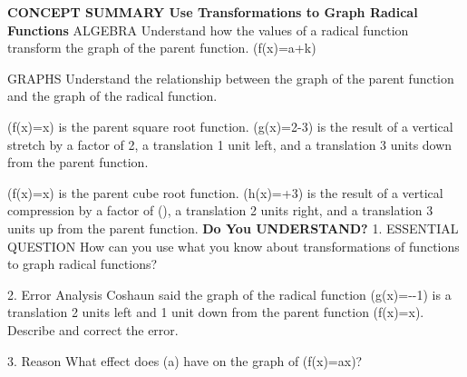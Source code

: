\documentclass{article}
\newenvironment{concept-summary}{}{}    %
\newcommand{\answer}[1]{}               %
\newcommand{\placeholder}[2]{}          %
\newcommand{\te}[1]{}                   %
\begin{document}
\begin{concept-summary}
\textbf{CONCEPT SUMMARY Use Transformations to Graph Radical Functions}
ALGEBRA Understand how the values of a radical function transform the graph of the parent function.
(f(x)=a+k)
\te{Callouts: (a) determines a vertical stretch or compression. (h) determines a horizontal translation. (k) determines a vertical translation.}
GRAPHS Understand the relationship between the graph of the parent function and the graph of the radical function.
\placeholder{graph}{Blue f(x)=sqrt(x) from(0,0), dashed green 2sqrt(x) from(0,0), red g(x)=2sqrt(x+1)-3 from(-1,-3). Curves have rightward arrows. Axes x,y arrows both ends, unit grid x=-2 to 8,y=-5 to 5; x labels 2,4,6, y labels-4,-2,2,4; origin O. No point dots.}
(f(x)=\sqrt x) is the parent square root function.
(g(x)=2-3) is the result of a vertical stretch by a factor of 2, a translation 1 unit left, and a translation 3 units down from the parent function.
\placeholder{graph}{Blue f(x)=cube root(x), dashed green one third cube root(x), both through(0,0), and red h(x)=one third cube root(x-2)+3 with center(2,3). Arrowheads both ends on all curves. Axes x,y with arrows both ends; x grid 2 labels-8,-4,4,8, window-10 to 10; y unit grid labels-2,2,4,6, window-3 to 7. Origin O.}
(f(x)=\sqrt[3]x) is the parent cube root function.
(h(x)=+3) is the result of a vertical compression by a factor of (), a translation 2 units right, and a translation 3 units up from the parent function.
\textbf{Do You UNDERSTAND?}
1. ESSENTIAL QUESTION How can you use what you know about transformations of functions to graph radical functions?
\answer{Vertical stretches and horizontal and vertical translations have the same effect on square root and cube root functions as they have on other types of functions, so you can use what you know about transforming those functions to graph radical functions.}
2. Error Analysis Coshaun said the graph of the radical function (g(x)=--1) is a translation 2 units left and 1 unit down from the parent function (f(x)=\sqrt x). Describe and correct the error.
\answer{The graph of (g(x)=-\sqrt{x+2}-1) is a translation 2 units left and 1 unit down from the parent function (f(x)=\sqrt x), after a reflection over the x-axis. Coshaun didn't notice the negative symbol.}
3. Reason What effect does (a) have on the graph of (f(x)=a\sqrt x)?
\answer{When (a) is positive, the graph of (f(x)=a\sqrt x) is stretched or compressed vertically by a factor of (a). When (a) is negative, the graph of (f(x)=a\sqrt x) is reflected over the x-axis and then stretched or compressed vertically by a factor of (|a|).}

\end{concept-summary}
\end{document}
